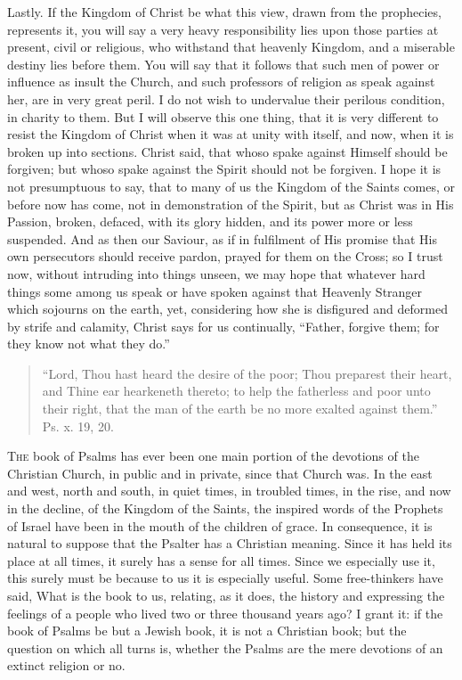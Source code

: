 Lastly. If the Kingdom of Christ be what this view, drawn from the
prophecies, represents it, you will say a very heavy responsibility
lies upon those parties at present, civil or religious, who withstand
that heavenly Kingdom, and a miserable destiny lies before them. You
will say that it follows that such men of power or influence as insult
the Church, and such professors of religion as speak against her, are
in very great peril. I do not wish to undervalue their perilous
condition, in charity to them. But I will observe this one thing, that
it is very different to resist the Kingdom of Christ when it was at
unity with itself, and now, when it is broken up into sections. Christ
said, that whoso spake against Himself should be forgiven; but whoso
spake against the Spirit should not be forgiven. I hope it is not
presumptuous to say, that to many of us the Kingdom of the Saints
comes, or before now has come, not in demonstration of the Spirit, but
as Christ was in His Passion, broken, defaced, with its glory hidden,
and its power more or less suspended. And as then our Saviour, as if
in fulfilment of His promise that His own persecutors should receive
pardon, prayed for them on the Cross; so I trust now, without
intruding into things unseen, we may hope that whatever hard things
some among us speak or have spoken against that Heavenly Stranger
which sojourns on the earth, yet, considering how she is disfigured
and deformed by strife and calamity, Christ says for us continually,
``Father, forgive them; for they know not what they do.''


\begin{quote}

``Lord, Thou hast heard the desire of the poor; Thou
preparest their heart, and Thine ear hearkeneth thereto; to help the
fatherless and poor unto their right, that the man of the earth be
no more exalted against them.'' Ps. x. 19, 20.

\end{quote}

T\textsc{he} book of Psalms has ever been one main portion of the devotions
of the Christian Church, in public and in private, since that Church
was. In the east and west, north and south, in quiet times, in
troubled times, in the rise, and now in the decline, of the Kingdom of
the Saints, the inspired words of the Prophets of Israel have been in
the mouth of the children of grace. In consequence, it is natural to
suppose that the Psalter has a Christian meaning. Since it has held
its place at all times, it surely has a sense for all times. Since we
especially use it, this surely must be because to us it is especially
useful. Some free-thinkers have said, What is the book to us,
relating, as it does, the history and expressing the feelings of a
people who lived two or three thousand years ago? I grant it: if the
book of Psalms be but a Jewish book, it is not a Christian book; but
the question on which all turns is, whether the Psalms are the mere
devotions of an extinct religion or no.

